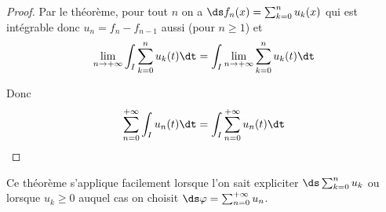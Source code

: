 \begin{proof}
    Par le théorème, pour tout $n$ on a $\ds f_n(x) = \sum_{k = 0}^{n } u_k(x)$ qui est intégrable
    donc $u_n = f_n - f_{n - 1}$ aussi (pour $n \geqslant 1$) et 
    $$\lim_{n \to + \infty} \int_I \sum_{k = 0}^{n } u_k(t) \dt = \int_I \lim_{n \to + \infty} \sum_{k = 0}^{n } u_k(t) \dt$$

    Donc $$\sum_{n = 0}^{+ \infty} \int_I u_n(t) \dt = \int_I \sum_{n = 0}^{+ \infty} u_n(t) \dt$$
\end{proof}

\begin{remarque}
    Ce théorème s'applique facilement lorsque l'on sait expliciter $\ds \sum_{k = 0}^{n } u_k$ ou lorsque 
    $u_k \geqslant 0$ auquel cas on choisit $\ds \varphi = \sum_{n = 0}^{+ \infty} u_n$. 
\end{remarque}

